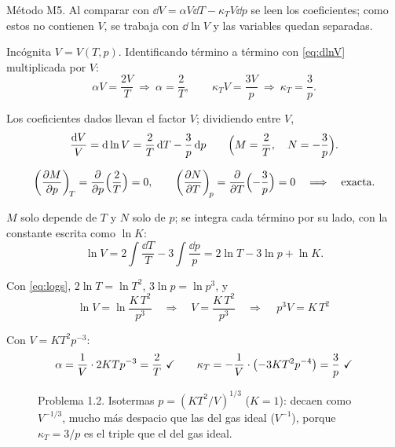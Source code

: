 \begin{resolucion}
\idea Método M5. Al comparar con $\dd V=\alpha V\dd T-\kappa_TV\dd p$ se leen los coeficientes; como estos
no contienen $V$, se trabaja con $\dd\ln V$ y las variables quedan separadas.

 Incógnita $V=V(T,p)$. Identificando término a término con
\eqref{eq:dlnV} multiplicada por $V$:
\[
  \alpha V=\frac{2V}{T}\ \Longrightarrow\ \alpha=\frac2T,\qquad
  \kappa_TV=\frac{3V}{p}\ \Longrightarrow\ \kappa_T=\frac3p.
\]

 Los coeficientes dados llevan el factor $V$; dividiendo entre $V$,
\[
  \frac{\mathrm{d} V}{V}=\mathrm{d}\ln V=\frac{2}{T}\,\mathrm{d} T-\frac{3}{p}\,\mathrm{d} p\qquad
  \Bigl(M=\frac2T,\quad N=-\frac3p\Bigr).
\]

\[
  \left(\frac{\partial M}{\partial p}\right)_{\!T}=\frac{\partial}{\partial p}\Bigl(\frac2T\Bigr)=0,\qquad
  \left(\frac{\partial N}{\partial T}\right)_{\!p}=\frac{\partial}{\partial T}\Bigl(-\frac3p\Bigr)=0\quad\Longrightarrow\quad\text{exacta.}
\]

 $M$ solo depende de $T$ y $N$ solo de $p$; se integra cada término
por su lado, con la constante escrita como $\ln K$:
\[
  \ln V=2\int\frac{\dd T}{T}-3\int\frac{\dd p}{p}=2\ln T-3\ln p+\ln K.
\]

 Con \eqref{eq:logs}, $2\ln T=\ln T^2$, $3\ln p=\ln p^3$, y
\[
  \ln V=\ln\frac{K\,T^2}{p^3}\quad\Longrightarrow\quad V=\frac{K\,T^2}{p^3}\quad\Longrightarrow\quad
  \boxed{\,p^3V=K\,T^2\,}
\]

 Con $V=KT^2p^{-3}$:
\[
  \alpha=\frac1V\cdot2KTp^{-3}=\frac2T\ \checkmark\qquad
  \kappa_T=-\frac1V\cdot\bigl(-3KT^2p^{-4}\bigr)=\frac3p\ \checkmark
\]
\end{resolucion}

\begin{figure}[htbp]
\centering
{}
\caption{Problema 1.2. Isotermas $p=(KT^2/V)^{1/3}$ ($K=1$): decaen como $V^{-1/3}$, mucho más
despacio que las del gas ideal ($V^{-1}$), porque $\kappa_T=3/p$ es el triple que el del gas ideal.}
\label{fig:p12}
\end{figure}

